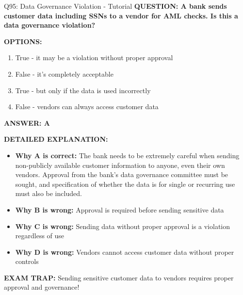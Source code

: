 \documentclass[8pt]{beamer}
\begin{document}
	\begin{frame}{Q95: Data Governance Violation - Tutorial}
		\fontsize{6.5}{7.5}\selectfont
		\textbf{QUESTION: A bank sends customer data including SSNs to a vendor for AML checks. Is this a data governance violation?}
		
		\vspace{0.1cm}
		\textbf{OPTIONS:}
		\begin{enumerate}
			\item True - it may be a violation without proper approval
			\item False - it's completely acceptable
			\item True - but only if the data is used incorrectly
			\item False - vendors can always access customer data
		\end{enumerate}
		
		\vspace{0.1cm}
		\textcolor{myblue}{\textbf{ANSWER: A}}
		
		\vspace{0.1cm}
		\textbf{DETAILED EXPLANATION:}
		\begin{itemize}
			\item \textbf{Why A is correct:} The bank needs to be extremely careful when sending non-publicly available customer information to anyone, even their own vendors. Approval from the bank's data governance committee must be sought, and specification of whether the data is for single or recurring use must also be included.
			\item \textbf{Why B is wrong:} Approval is required before sending sensitive data
			\item \textbf{Why C is wrong:} Sending data without proper approval is a violation regardless of use
			\item \textbf{Why D is wrong:} Vendors cannot access customer data without proper controls
		\end{itemize}
		
		\textcolor{myred}{\textbf{EXAM TRAP:}} Sending sensitive customer data to vendors requires \textcolor{myblue}{proper approval and governance}!
	\end{frame}
	
\end{document}
